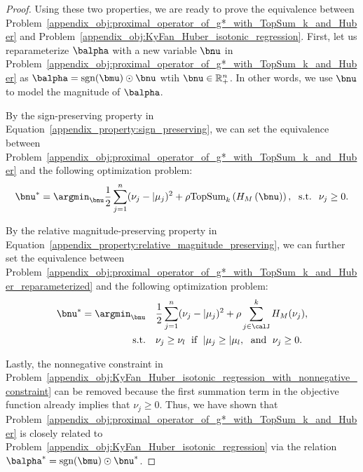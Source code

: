 \begin{proof}
    Using these two properties, we are ready to prove the equivalence between Problem~\eqref{appendix_obj:proximal_operator_of_g*_with_TopSum_k_and_Huber} and Problem~\eqref{appendix_obj:KyFan_Huber_isotonic_regression}.
    First, let us reparameterize $\balpha$ with a new variable $\bnu$ in Problem~\eqref{appendix_obj:proximal_operator_of_g*_with_TopSum_k_and_Huber} as $\balpha = \text{sgn}(\bmu) \odot \bnu$ wtih $\bnu \in \mathbb{R}_{+}^n$.
    In other words, we use $\bnu$ to model the magnitude of $\balpha$.
    
    By the sign-preserving property in Equation~\eqref{appendix_property:sign_preserving}, we can set the equivalence between Problem~\eqref{appendix_obj:proximal_operator_of_g*_with_TopSum_k_and_Huber} and the following optimization problem:
    \begin{align}
        \label{appendix_obj:proximal_operator_of_g*_with_TopSum_k_and_Huber_reparameterized}
        \bnu^* = \argmin_{\bnu} \frac{1}{2} \sum_{j=1}^n (\nu_j - \vert{\mu_j})^2 + \rho \text{TopSum}_k\left( H_M\left( \bnu \right) \right), \; \text{ s.t. } \; \nu_j \geq 0.
    \end{align}
    
    By the relative magnitude-preserving property in Equation~\eqref{appendix_property:relative_magnitude_preserving}, we can further set the equivalence between Problem~\eqref{appendix_obj:proximal_operator_of_g*_with_TopSum_k_and_Huber_reparameterized} and the following optimization problem:
    \begin{align}
        \label{appendix_obj:KyFan_Huber_isotonic_regression_with_nonnegative_constraint}
        \bnu^* = \argmin_{\bnu} & \quad \frac{1}{2} \sum_{j=1}^n (\nu_j - \vert{\mu_j})^2 + \rho \sum_{j \in \calJ}^k H_M (\nu_j), \\
        \text{s.t.} & \quad \nu_j \geq \nu_l \; \text{ if } \; \vert{\mu_j} \geq \vert{\mu_l}, \; \text{ and } \; \nu_j \geq 0. \nonumber
    \end{align}
    
    Lastly, the nonnegative constraint in Problem~\eqref{appendix_obj:KyFan_Huber_isotonic_regression_with_nonnegative_constraint} can be removed because the first summation term in the objective function already implies that $\nu_j \geq 0$.
    Thus, we have shown that Problem~\eqref{appendix_obj:proximal_operator_of_g*_with_TopSum_k_and_Huber} is closely related to Problem~\eqref{appendix_obj:KyFan_Huber_isotonic_regression} via the relation $\balpha^* = \text{sgn}(\bmu) \odot \bnu^*$.
\end{proof}

